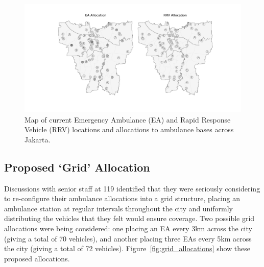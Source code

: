 \documentclass[preprint,12pt]{elsarticle}
\begin{document}
\begin{figure} \begin{center}
    \includegraphics[width=\textwidth]{img/map_current} \caption{Map of current
    Emergency Ambulance (EA) and Rapid Response Vehicle (RRV) locations and
    allocations to ambulance bases across Jakarta.}
    \label{fig:current_allocation} \end{center} \end{figure}

\subsection{Proposed `Grid' Allocation}\label{sec:analysis_grid} Discussions
with senior staff at 119 identified that they were seriously considering to
re-configure their ambulance allocations into a grid structure, placing an
ambulance station at regular intervals throughout the city and uniformly
distributing the vehicles that they felt would ensure coverage. Two possible
grid allocations were being considered: one placing an EA every 3km across the
city (giving a total of 70 vehicles), and another placing three EAs every 5km
across the city (giving a total of 72 vehicles).
Figure~\ref{fig:grid_allocations} show these proposed allocations.
\end{document}
